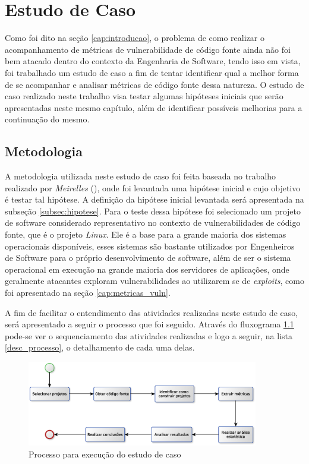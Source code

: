 \chapter{Estudo de Caso} \label{estudodecaso}

Como foi dito na seção \ref{cap:introducao}, o problema de como realizar o
acompanhamento de métricas de vulnerabilidade de código fonte ainda não foi bem
atacado dentro do contexto da Engenharia de Software, tendo isso em vista,
foi trabalhado um estudo de caso a fim de tentar identificar qual a melhor forma
de se acompanhar e analisar métricas de código fonte dessa natureza. O estudo
de caso realizado neste trabalho visa testar algumas hipóteses iniciais que serão apresentadas
neste mesmo capítulo, além de identificar possíveis melhorias para a continuação
do mesmo.

\section{Metodologia}

A metodologia utilizada neste estudo de caso foi feita baseada no trabalho
realizado por \emph{Meirelles} (\citeyear{meirelles2013}), onde foi levantada
uma hipótese inicial e cujo objetivo é testar tal hipótese. A definição da
hipótese inicial levantada será apresentada na subseção \ref{subsec:hipotese}.
Para o teste dessa hipótese foi selecionado um projeto de software considerado
representativo no contexto de vulnerabilidades de código fonte, que é o projeto
\emph{Linux}. Ele é a base para a grande maioria dos sistemas operacionais
disponíveis, esses sistemas são bastante utilizados por Engenheiros de Software para
o próprio desenvolvimento de software, além de ser o sistema operacional em
execução na grande maioria dos servidores de aplicações, onde geralmente
atacantes exploram vulnerabilidades ao utilizarem se de \textit{exploits}, como
foi apresentado na seção \ref{cap:metricas_vuln}.

A fim de facilitar o entendimento das atividades realizadas neste estudo de
caso, será apresentado a seguir o processo que foi seguido. Através do
fluxograma \ref{fig:processo_estudo_de_caso} pode-se ver o sequenciamento das
atividades realizadas e logo a seguir, na lista \ref{desc_processo}, o
detalhamento de cada uma delas.

\begin{figure}[h]
  \centering
  \includegraphics[width=0.9\textwidth]
      {figuras/estudo_de_caso_processo.eps}
  \caption{Processo para execução do estudo de caso}
  \label{fig:processo_estudo_de_caso}
\end{figure}

